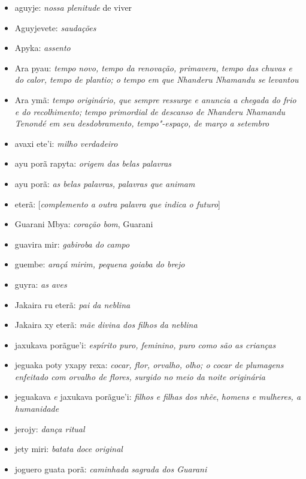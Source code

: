  

\begin{itemize}
\itemsep1pt\parskip0pt
\item
  aguyje: \emph{nossa plenitude} de viver
\item
  Aguyjevete: \emph{saudações}
\item
  Apyka: \emph{assento}
\item
  Ara pyau: \emph{tempo novo, tempo da renovação, primavera, tempo das
  chuvas e do calor, tempo de plantio; o} \emph{tempo em que Nhanderu
  Nhamandu se levantou}
\item
  Ara ymã: \emph{tempo originário, que sempre ressurge e anuncia a
  chegada do frio e do recolhimento;} \emph{tempo primordial de descanso
  de Nhanderu Nhamandu Tenondé em seu desdobramento, tempo"-espaço, de
  março a setembro} 
\item
  avaxi ete'i: \emph{milho verdadeiro}
\item
  ayu porã rapyta: \emph{origem das belas palavras}
\item
  ayu porã: \emph{as belas palavras,} \emph{palavras que animam}
\item
  eterã: [\emph{complemento a outra palavra que indica o futuro}]
\item
  Guarani Mbya: \emph{coração bom}, Guarani
\item
  guavira mir: \emph{gabiroba do campo}
\item
  guembe: \emph{araçá mirim, pequena goiaba do brejo}
\item
  guyra: \emph{as aves}
\item
  Jakaira ru eterã: \emph{pai da neblina}
\item
  Jakaira xy eterã: \emph{mãe divina dos filhos da neblina}
\item
  jaxukava porãgue'i: \emph{espírito puro, feminino, puro como são as crianças}
\item
  jeguaka poty yxapy rexa: \emph{cocar, flor, orvalho, olho; o cocar de
  plumagens enfeitado com orvalho de flores, surgido no meio da noite
  originária}
\item
  jeguakava \emph{e} jaxukava porãgue'i: \emph{filhos e filhas dos}
  \emph{nhẽe}, \emph{homens e mulheres, a humanidade}
\item
  jerojy: \emph{dança ritual}
\item
  jety miri: \emph{batata doce original}
\item
  joguero guata porã: \emph{caminhada} \emph{sagrada dos Guarani
}
\end{itemize}
